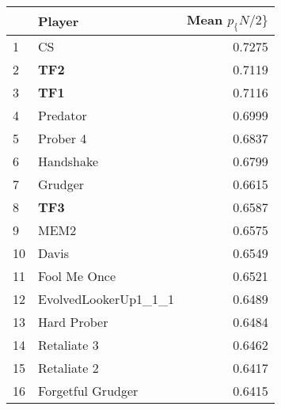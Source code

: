 \begin{tabular}{llr}
\toprule
{} &                Player &  Mean $p_\{N/2\}$ \\
\midrule
1  &                    CS &          0.7275 \\
2  &                   \textbf{TF2} &          0.7119 \\
3  &                   \textbf{TF1} &          0.7116 \\
4  &              Predator &          0.6999 \\
5  &              Prober 4 &          0.6837 \\
6  &             Handshake &          0.6799 \\
7  &               Grudger &          0.6615 \\
8  &                   \textbf{TF3} &          0.6587 \\
9  &                  MEM2 &          0.6575 \\
10 &                 Davis &          0.6549 \\
11 &          Fool Me Once &          0.6521 \\
12 &  EvolvedLookerUp1\_1\_1 &          0.6489 \\
13 &           Hard Prober &          0.6484 \\
14 &           Retaliate 3 &          0.6462 \\
15 &           Retaliate 2 &          0.6417 \\
16 &     Forgetful Grudger &          0.6415 \\
\bottomrule
\end{tabular}
